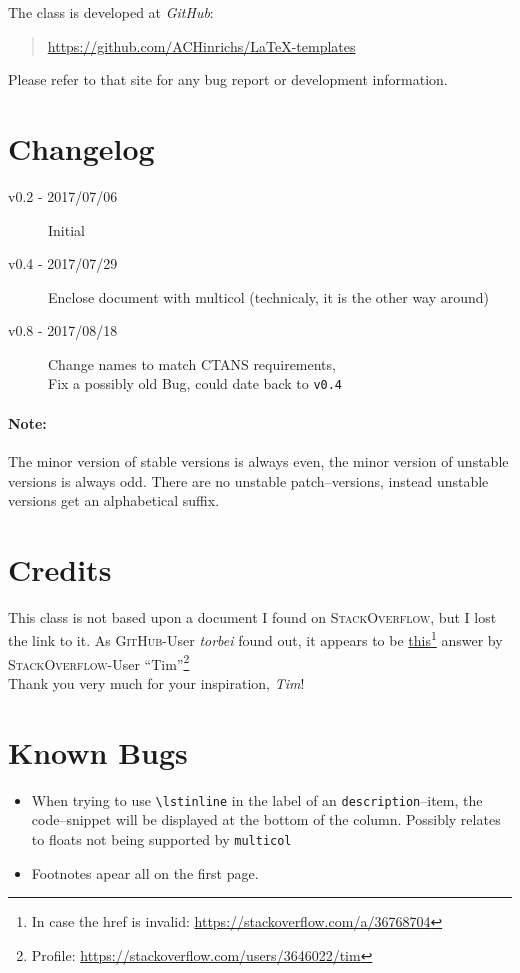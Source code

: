 \documentclass[a4paper,landscape,columns=3]{cheatsheet}
\begin{document}
The class is developed at \emph{GitHub}:
\begin{quote}
	\url{https://github.com/ACHinrichs/LaTeX-templates}
\end{quote}
Please refer to that site for any bug report or development
information.
\section{Changelog}
\begin{description}
	\item[v0.2 - 2017/07/06] Initial
	\item[v0.4 - 2017/07/29] Enclose document with multicol (technicaly,
		it is the other way around)
	\item[v0.8 - 2017/08/18] Change names to match CTANS requirements,\\
		Fix a possibly old Bug, could date back to \lstinline{v0.4}
\end{description}
\paragraph{Note: }The minor version of stable versions is always even,
the minor version of unstable versions is always odd. There are no
unstable patch--versions, instead unstable versions get an
alphabetical suffix.\\

\section{Credits}
This class is not based upon a document I found on
\textsc{StackOverflow}, but I lost the link to it. As \textsc{GitHub}-User
\emph{torbei} found out, it appears to be
\href{https://stackoverflow.com/a/36768704}{this}\footnote{In case the
	href is invalid: \url{https://stackoverflow.com/a/36768704}} answer by
\textsc{StackOverflow}-User \enquote{Tim}\footnote{Profile:
	\url{https://stackoverflow.com/users/3646022/tim}}\\

Thank you very much for your inspiration, \emph{Tim}!

\section{Known Bugs}
\begin{itemize}
	\item When trying to use \lstinline{\lstinline} in the label of an
	      \lstinline{description}--item, the code--snippet will be displayed
	      at the bottom of the column. Possibly relates to floats not being
	      supported by \lstinline{multicol}%
	\item Footnotes apear all on the first page.
\end{itemize}
\end{document}

